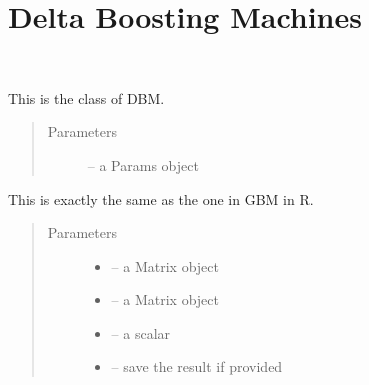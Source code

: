 \documentclass[letterpaper,10pt,english]{sphinxmanual}
\begin{document}
\section{Delta Boosting Machines}
\label{\detokenize{index:delta-boosting-machines}}

\begin{fulllineitems}
\label{\detokenize{index:dbm_py.interface.DBM}}~

\begin{fulllineitems}
\label{\detokenize{index:dbm_py.interface.DBM.__init__}}
This is the class of DBM.
\begin{quote}\begin{description}
\item[{Parameters}] \leavevmode
{} -- a Params object

\end{description}\end{quote}

\end{fulllineitems}


\begin{fulllineitems}
\label{\detokenize{index:dbm_py.interface.DBM.calibrate_plot}}
This is exactly the same as the one in GBM in R.
\begin{quote}\begin{description}
\item[{Parameters}] \leavevmode\begin{itemize}
\item {} 
 -- a Matrix object

\item {} 
 -- a Matrix object

\item {} 
 -- a scalar

\item {} 
 -- save the result if provided


\end{itemize}
\end{description}
\end{quote}
\end{fulllineitems}
\end{fulllineitems}
\end{document}

